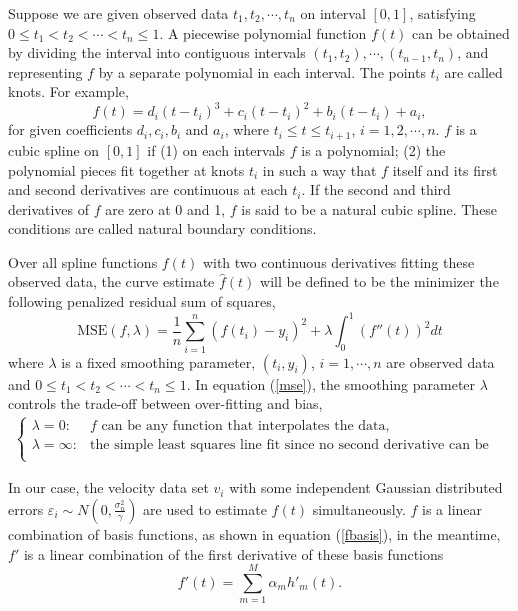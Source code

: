 Suppose we are given observed data $t_1,t_2, \cdots, t_n$ on interval $[0,1]$, satisfying $0\leq t_1< t_2 < \cdots <t_n \leq 1$. A piecewise polynomial function $f(t)$ can be obtained by dividing the interval into contiguous
intervals $(t_1,t_2),\cdots,(t_{n-1},t_n)$, and representing $f$ by a separate polynomial in each interval. The points $t_i$ are called knots. For example,
\begin{equation}
f(t)=d_i(t-t_i)^3+c_i(t-t_i)^2+b_i(t-t_i)+a_i,
\end{equation}
for given coefficients $d_i, c_i, b_i$ and $a_i$, where $t_i\leq t\leq t_{i+1}$, $i=1,2,\cdots,n$. $f$ is a cubic spline on $[0,1]$ if (1) on each intervals $f$ is a polynomial; (2) the polynomial pieces fit together at knots $t_i$ in such a way that $f$ itself and its first and second derivatives are continuous at each $t_i$. If the second and third derivatives of $f$ are zero at 0 and 1, $f$ is said to be a natural cubic spline. These conditions are called natural boundary conditions.

Over all spline functions $f(t)$ with two continuous derivatives fitting these observed data, the curve estimate  $\hat{f}(t)$ will be defined to be the minimizer the following penalized residual sum of squares, 
\begin{equation}\label{mse}
\text{MSE}(f,\lambda)=\frac{1}{n}\sum_{i=1}^n(f(t_i)-y_i)^2+\lambda \int_{0}^{1}(f''(t))^2dt
\end{equation}
where $\lambda$ is a fixed smoothing parameter, $(t_i,y_i)$, $i=1, \cdots, n$ are observed data and $0 \leq t_1< t_2 < \cdots <t_n \leq 1$. In equation (\ref{mse}),  the smoothing parameter $\lambda$ controls the trade-off between over-fitting and bias,
\begin{align}
\begin{cases}
\lambda = 0 : & \mbox{$f$ can be any function that interpolates the data,}\\
\lambda = \infty: & \mbox{the simple least squares line fit since no second derivative can be tolerated.}\\
\end{cases}
\end{align}

In our case, the velocity data set $v_i$ with some independent Gaussian distributed errors $\varepsilon_i \sim N(0, \frac{\sigma_n^2}{\gamma})$ are used to estimate $f(t)$ simultaneously. $f$ is a linear combination of basis functions, as shown in equation (\ref{fbasis}), in the meantime, $f'$ is a linear combination of the first derivative of these basis functions
\begin{equation}
f'(t) =\sum_{m=1}^{M}\alpha_mh'_m(t).
\end{equation}

